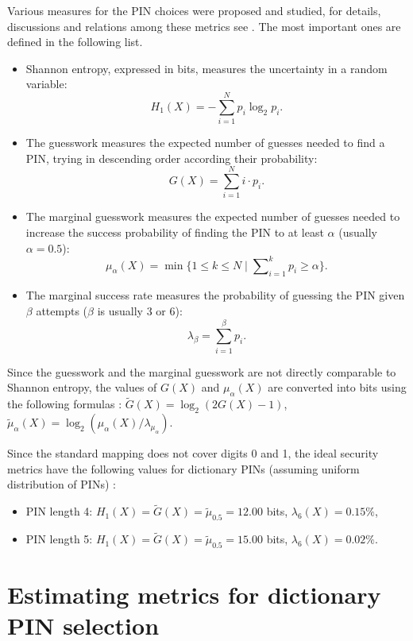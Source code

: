 \documentclass[a4paper, 11pt]{article}
\begin{document}
Various measures for the PIN choices were proposed and studied, for details, discussions and relations 
among these metrics see \cite{BJM10,BPA12,W10}. The most important ones are defined in the following list.

\begin{itemize}
\renewcommand{\labelitemi}{$-$}
\item Shannon entropy, expressed in bits, measures the uncertainty in a random variable: 
  \[ H_1(X) = - \sum_{i=1}^N p_i \log_2 p_i. \]
\item The guesswork measures the expected number of guesses needed to find a PIN, trying in descending 
  order according their probability:
  \[ G(X) = \sum_{i=1}^N i\cdot p_i. \]
\item The marginal guesswork measures the expected number of guesses needed to increase the success 
probability of finding the PIN to at least $\alpha$ (usually $\alpha = 0.5$):
 \[ \mu_\alpha(X) = \min \{1\leq k \leq N\mid {\textstyle\sum\nolimits_{i=1}^k p_i} \geq \alpha\}. \]
\item The marginal success rate measures the probability of guessing the PIN given $\beta$ attempts
  ($\beta$ is usually $3$ or $6$):
  \[ \lambda_\beta = \sum_{i=1}^\beta p_i. \]
\end{itemize}

Since the guesswork and the marginal guesswork are not directly comparable to Shannon entropy, 
the values of $G(X)$ and $\mu_\alpha(X)$ are converted into bits using the following formulas \cite{BJM10}:
$\tilde G(X) = \log_2(2G(X)-1)$, $\tilde \mu_\alpha(X) = \log_2 (\mu_\alpha(X)/\lambda_{\mu_\alpha})$.

Since the standard mapping does not cover digits 0 and 1, the ideal security metrics have the following 
values for dictionary PINs (assuming uniform distribution of PINs) :

\begin{itemize}
\renewcommand{\labelitemi}{$-$}
\item PIN length 4: $H_1(X) = \tilde G(X) = \tilde \mu_{0.5} = 12.00$ bits, $\lambda_6(X)= 0.15\%$,
\item PIN length 5: $H_1(X) = \tilde G(X) = \tilde \mu_{0.5} = 15.00$ bits, $\lambda_6(X)= 0.02\%$.
\end{itemize}


\section{Estimating metrics for dictionary PIN selection}
\end{document}
